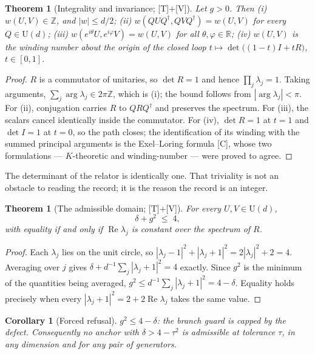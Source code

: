 \documentclass[11pt]{article}
\theoremstyle{definition}
\theoremstyle{plain}
\newtheorem{theorem}[definition]{Theorem}
\newtheorem{corollary}[definition]{Corollary}
\begin{document}
\begin{theorem}[Integrality and invariance; {[T]}$+${[V]}]
Let $g > 0$. Then
(i) $w(U,V) \in \mathbb{Z}$, and $|w| \le d/2$;
(ii) $w(QUQ^{\dagger}, QVQ^{\dagger}) = w(U,V)$ for every $Q \in \mathrm{U}(d)$;
(iii) $w(e^{i\theta}U, e^{i\varphi}V) = w(U,V)$ for all $\theta,\varphi \in
\mathbb{R}$;
(iv) $w(U,V)$ is the winding number about the origin of the closed loop
$t \mapsto \det\!\big((1-t)I + tR\big)$, $t \in [0,1]$.
\end{theorem}

\begin{proof}
$R$ is a commutator of unitaries, so $\det R = 1$ and hence $\prod_j \lambda_j = 1$.
Taking arguments, $\sum_j \arg\lambda_j \in 2\pi\mathbb{Z}$, which is (i); the bound
follows from $|\arg\lambda_j| < \pi$. For (ii), conjugation carries $R$ to
$QRQ^{\dagger}$ and preserves the spectrum. For (iii), the scalars cancel
identically inside the commutator. For (iv), $\det R = 1$ at $t = 1$ and
$\det I = 1$ at $t = 0$, so the path closes; the identification of its winding with
the summed principal arguments is the Exel--Loring formula [C], whose two
formulations --- $K$-theoretic and winding-number --- were proved to agree.
\end{proof}

The determinant of the relator is identically one. That triviality is not an
obstacle to reading the record; it is the reason the record is an integer.

\begin{theorem}[The admissible domain; {[T]}$+${[V]}]
For every $U,V \in \mathrm{U}(d)$,
\begin{equation}
\delta + g^{2} \;\le\; 4 ,
\end{equation}
with equality if and only if $\operatorname{Re}\lambda_j$ is constant over the
spectrum of $R$.
\end{theorem}

\begin{proof}
Each $\lambda_j$ lies on the unit circle, so
$|\lambda_j - 1|^{2} + |\lambda_j + 1|^{2} = 2|\lambda_j|^{2} + 2 = 4$. Averaging
over $j$ gives $\delta + d^{-1}\sum_j |\lambda_j+1|^{2} = 4$ exactly. Since $g^{2}$
is the minimum of the quantities being averaged,
$g^{2} \le d^{-1}\sum_j|\lambda_j+1|^{2} = 4 - \delta$. Equality holds precisely
when every $|\lambda_j+1|^{2} = 2 + 2\operatorname{Re}\lambda_j$ takes the same
value.
\end{proof}

\begin{corollary}[Forced refusal]
$g^{2} \le 4 - \delta$: the branch guard is capped by the defect. Consequently no
anchor with $\delta > 4 - \tau^{2}$ is admissible at tolerance $\tau$, in any
dimension and for any pair of generators.
\end{corollary}
\end{document}
